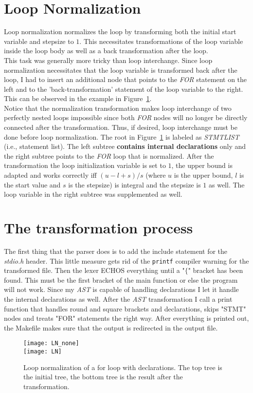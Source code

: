 \documentclass{scrartcl}
\begin{document}
\section{Loop Normalization}
Loop normalization normalizes the loop by transforming both the initial start variable and stepsize to $1$. This necessitates transformations of the loop variable inside the loop body as well as a back transformation after the loop.\\
This task was generally more tricky than loop interchange. Since loop normalization necessitates that the loop variable is transformed back after the loop, I had to insert an additional node that points to the \textit{FOR} statement on the left and to the 'back-transformation' statement of the loop variable to the right. This can be observed in the example in Figure~\ref{fig:LN}.\\
Notice that the normalization transformation makes loop interchange of two perfectly nested loops impossible since both \textit{FOR} nodes will no longer be directly connected after the transformation. Thus, if desired, loop interchange must be done before loop normalization. The root in Figure~\ref{fig:LN} is labeled as \textit{STMTLIST} (i.e., statement list). The left subtree \textbf{contains internal declarations} only and the right subtree points to the \textit{FOR} loop that is normalized. After the transformation the loop initialization variable is set to $1$, the upper bound is adapted and works correctly iff $(u - l + s) / s$ (where $u$ is the upper bound, $l$ is the start value and $s$ is the stepsize) is integral and the stepsize is $1$ as well. The loop variable in the right subtree was supplemented as well.

\section{The transformation process}
The first thing that the parser does is to add the include statement for the \textit{stdio.h} header. This little measure gets rid of the \texttt{printf} compiler warning for the transformed file. Then the lexer ECHOS everything until a "$\{$" bracket has been found. This must be the first bracket of the main function or else the program will not work. Since my \textit{AST} is capable of handling declarations I let it handle the internal declarations as well. After the \textit{AST} transformation I call a print function that handles round and square brackets and declarations, skips "STMT" nodes and treats "FOR" statements the right way.
After everything is printed out, the Makefile makes sure that the output is redirected in the output file.
\begin{figure}
\centering
\texttt{[image: LN\_none]}
\vspace{.2cm}\\
\texttt{[image: LN]}
\caption{Loop normalization of a for loop with declarations. The top tree is the initial tree, the bottom tree is the result after the transformation.}
\label{fig:LN}
\end{figure}
\end{document}
